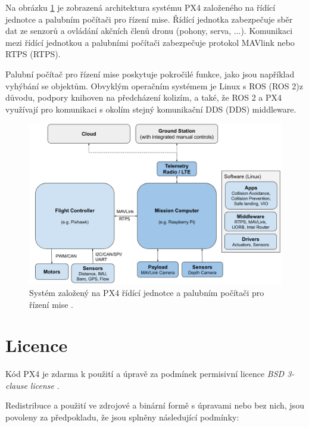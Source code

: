 Na obrázku \ref{fig:PX4_FC_PC} je zobrazená architektura systému PX4 založeného na řídící jednotce a palubním počítači pro řízení mise. Řídící jednotka zabezpečuje sběr dat ze senzorů a ovládání akčních členů dronu (pohony, serva, ...). Komunikaci mezi řídící jednotkou a palubními počítači zabezpečuje protokol MAVlink nebo \acs{RTPS} (\acl{RTPS}).

Palubní počítač pro řízení mise poskytuje pokročilé funkce, jako jsou například vyhýbání se objektům. Obvyklým operačním systémem je Linux s ROS (ROS 2)\break z důvodu, podpory knihoven na předcházení kolizím, a také, že ROS 2 a PX4 využívají pro komunikaci s okolím stejný komunikační \acs{DDS} (\acl{DDS}) middleware.

\begin{figure}[!ht]
    \begin{center}
        \includegraphics[scale=0.39]{obrazky/PX43}
    \end{center}
    \caption[Systém založený na PX4 řídící jednotce a palubním počítači pro řízení mise]{Systém založený na PX4 řídící jednotce a palubním počítači pro řízení mise \cite{PX4docs}.}
    \label{fig:PX4_FC_PC}
\end{figure}

\section{Licence}

Kód PX4 je zdarma k použití a úpravě za podmínek permisivní licence \textit{BSD 3-clause license} \cite{BSDlicense}.

Redistribuce a použití ve zdrojové a binární formě s úpravami nebo bez nich, jsou povoleny za předpokladu, že jsou splněny následující podmínky:

